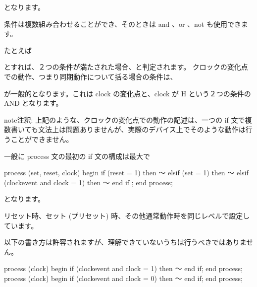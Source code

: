 \documentclass[letterpaper,10pt,dvipdfmx]{sphinxmanual}
\begin{document}
となります。

条件は複数組み合わせることができ、そのときは and 、or 、not も使用できます。

たとえば

\begin{sphinxVerbatim}[commandchars=\\\{\}]
      
\end{sphinxVerbatim}

とすれば、２つの条件が満たされた場合、と判定されます。
クロックの変化点での動作、つまり同期動作について括る場合の条件は、

\begin{sphinxVerbatim}[commandchars=\\\{\}]
    
\end{sphinxVerbatim}

が一般的となります。これは clock の変化点と、clock が H という２つの条件の AND となります。

\begin{sphinxadmonition}{note}{注釈:}
上記のような、クロックの変化点での動作の記述は、一つの if 文で複数書いても文法上は問題ありませんが、実際のデバイス上でそのような動作は行うことができません。
\end{sphinxadmonition}

一般に process 文の最初の if 文の構成は最大で

\begin{sphinxVerbatim}[commandchars=\\\{\}]
process (set, reset, clock)
begin
  if (reset = \PYGZsq{}1\PYGZsq{}) then
    ～
  elsif (set = \PYGZsq{}1\PYGZsq{}) then
    ～
  elsif (clock\PYGZsq{}event and clock = \PYGZsq{}1\PYGZsq{}) then
    ～
  end if ;
end process;
\end{sphinxVerbatim}

となります。

リセット時、セット (プリセット) 時、その他通常動作時を同じレベルで設定しています。

以下の書き方は許容されますが、理解できていないうちは行うべきではありません。

\begin{sphinxVerbatim}[commandchars=\\\{\}]
process (clock)
begin
  if (clock\PYGZsq{}event and clock = \PYGZsq{}1\PYGZsq{}) then
    ～
  end if;
end process;
process (clock)
begin
  if (clock\PYGZsq{}event and clock = \PYGZsq{}0\PYGZsq{}) then
    ～
  end if;
end process;
\end{sphinxVerbatim}
\end{document}
